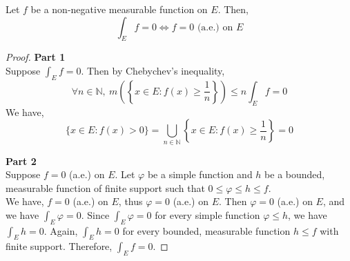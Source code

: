 \begin{theorem}
	Let $f$ be a non-negative measurable function on $E$.
	Then,
	\begin{equation}
		\int_E f = 0 \iff f = 0 \text{ (a.e.) on } E
	\end{equation}
\end{theorem}
\begin{proof}
	\textbf{Part 1}\\
	Suppose $\displaystyle \int_E f = 0$.
	Then by Chebychev's inequality,
	\[ \forall n \in \mathbb{N},\  m\left(\left\{x \in E : f(x) \ge \frac{1}{n} \right\}\right) \le n\int_E f = 0 \]
	We have,
	\[ \{ x \in E : f(x) > 0 \} = \bigcup_{n \in \mathbb{N}} \left\{ x \in E : f(x) \ge \frac{1}{n} \right\} = 0 \]

	\textbf{Part 2}\\
	Suppose $f = 0$ (a.e.) on $E$.
	Let $\varphi$ be a simple function and $h$ be a bounded, measurable function of finite support such that $0 \le \varphi \le h \le f$.\\

	We have, $f = 0$ (a.e.) on $E$, thus $\varphi =  0$ (a.e.) on $E$.
	Then $\varphi = 0$ (a.e.) on $E$, and we have $\int_E \varphi =  0$.
	Since $\int_E \varphi = 0$ for every simple function $\varphi \le h$, we have $\int_E h = 0$. 
	Again,  $\int_E h = 0$ for every bounded, measurable function $h \le f$  with finite support.
	Therefore, $\int_E f =  0$.
\end{proof}


